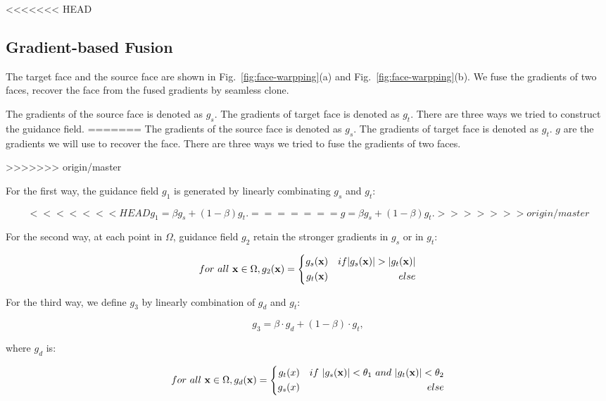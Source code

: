 \begin{center}
<<<<<<< HEAD
\subsection{Gradient-based Fusion}
\label{sec:fusion}

The target face and the source face are shown in Fig.~\ref{fig:face-warpping}(a) and Fig.~\ref{fig:face-warpping}(b). We fuse the gradients of two faces, recover the face from the fused gradients by seamless clone.

The gradients of the source face is denoted as $g_s$. The gradients of target face is denoted as $g_t$. There are three ways we tried to construct the guidance field.
=======
The gradients of the source face is denoted as $g_s$. The gradients of target face is denoted as $g_t$. $g$ are the gradients we will use to recover the face. There are three ways we tried to fuse the gradients of two faces.
 
>>>>>>> origin/master

For the first way, the guidance field $g_1$ is generated  by linearly combinating $g_s$ and $g_t$:

\begin{equation}
\label{eq:gradient-linear}
<<<<<<< HEAD
g_1 = \beta g_s+(1-\beta) g_t.
=======
g = \beta g_s+(1-\beta) g_t.
>>>>>>> origin/master
\end{equation}

For the second way, at each point in $\Omega$, guidance field $g_2$ retain the stronger gradients in $g_s$ or in $g_t$:

\begin{equation}
\label{eq:gradient-mixed}
for\ all\ \vb{x} \in \Omega, g_2(\vb{x})=\left\{
\begin{aligned}
g_s(\vb{x}) &&{if |g_s(\vb{x})|>|g_t(\vb{x})|}\\
g_t(\vb{x}) &&{else}\\
\end{aligned}
\right.
\end{equation}

For the third way, we define $g_3$ by linearly combination of $g_d$ and $g_t$:

\begin{equation}
\label{eq:gradient-shed}
g_3 = \beta \cdot g_d+(1-\beta) \cdot g_t,
\end{equation}


where $g_d$ is:

\begin{equation}
\label{eq:gradient-mixed-sub}
for\ all\ \vb{x} \in \Omega, g_d(\vb{x})=\left\{
\begin{aligned}
g_t(x) &&{if \ |g_s(\vb{x})|< \theta_1 \ and \ |g_t(\vb{x})|< \theta_2}\\
g_s(x) &&{else}\\
\end{aligned}
\right.
\end{equation}



\end{center}

